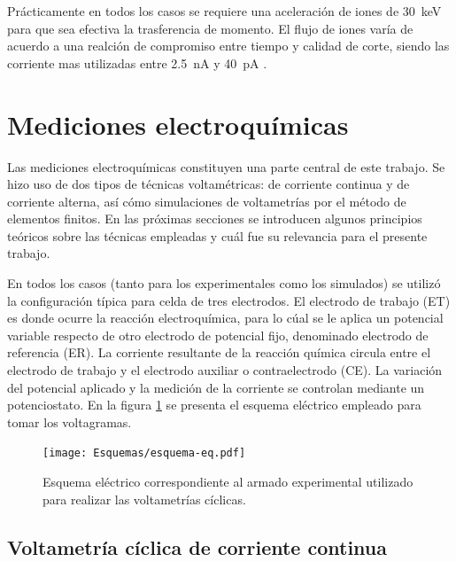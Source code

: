 		Prácticamente en todos los casos se requiere una aceleración de iones de \SI{30}{\kilo\electronvolt} para que sea efectiva la trasferencia de momento. El flujo de iones varía de acuerdo a una realción de compromiso entre tiempo y calidad de corte, siendo las corriente mas utilizadas entre \SI{2.5}{\nano\ampere} y \SI{40}{\pico\ampere} \cite{Orloff2003,Reyntjens2001}.

\section{Mediciones electroquímicas}\label{sec:medidas_eq}
			
			Las mediciones electroquímicas constituyen una parte central de este trabajo. Se hizo uso de dos tipos de técnicas voltamétricas: de corriente continua y de corriente alterna, así cómo simulaciones de voltametrías por el método de elementos finitos. En las próximas secciones se introducen algunos principios teóricos sobre las técnicas empleadas y cuál fue su relevancia para el presente trabajo.

			En todos los casos (tanto para los experimentales como los simulados) se utilizó la configuración típica para celda de tres electrodos.\cite{Wi2000} El electrodo de trabajo (ET) es donde ocurre la reacción electroquímica, para lo cúal se le aplica un potencial variable respecto de otro electrodo de potencial fijo, denominado electrodo de referencia (ER). La corriente resultante de la reacción química circula entre el electrodo de trabajo y el electrodo auxiliar o contraelectrodo (CE). La variación del potencial aplicado y la medición de la corriente se controlan mediante un potenciostato. En la figura \ref{fig:eq-circuito} se presenta el esquema eléctrico empleado para tomar los voltagramas. 

				\begin{figure}[b!]
			 		  \begin{center}
			 		  \texttt{[image: Esquemas/esquema-eq.pdf]}
			 		  \caption[Circuito eléctrico EQ]{Esquema eléctrico correspondiente al armado experimental utilizado para realizar las voltametrías cíclicas.}
			 		  \label{fig:eq-circuito}
			 		  \end{center}
			 		  \end{figure}
		
	 \subsection{Voltametría cíclica de corriente continua}
	 		
